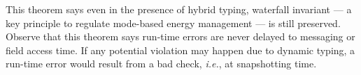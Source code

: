 \documentclass[onecolumn,nocopyrightspace]{sigplanconf}
\theoremstyle{lessintrusive}
\theoremstyle{plain}
\theoremstyle{custom}
\begin{document}
This theorem says even in the presence of hybrid typing, waterfall invariant --- a key principle to regulate mode-based energy management --- is still preserved. Observe that this theorem says run-time errors are never delayed to messaging or field access time. If any potential violation may happen due to dynamic typing, a run-time error would result from a bad check, \emph{i.e.}, at snapshotting time.
\end{document}
